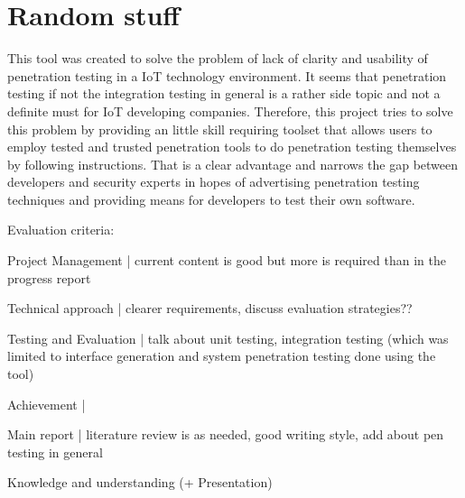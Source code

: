 \section{Random stuff}

This tool was created to solve the problem of lack of clarity and usability of penetration testing in a IoT technology environment. It seems that penetration testing if not the integration testing in general is a rather side topic and not a definite must for IoT developing companies. Therefore, this project tries to solve this problem by providing an little skill requiring toolset that allows users to employ tested and trusted penetration tools to do penetration testing themselves by following instructions. That is a clear advantage and narrows the gap between developers and security experts in hopes of advertising penetration testing techniques and providing means for developers to test their own software.


Evaluation criteria:
\begin{list}{-}
	\item Project Management | current content is good but more is required than in the progress report
	\item Technical approach | clearer requirements, discuss evaluation strategies??
	\item Testing and Evaluation | talk about unit testing, integration testing (which was limited to interface generation and system penetration testing done using the tool) 
	\item Achievement | 
	\item Main report | literature review is as needed, good writing style, add about pen testing in general
	\item Knowledge and understanding (+ Presentation)
\end{list}
	
